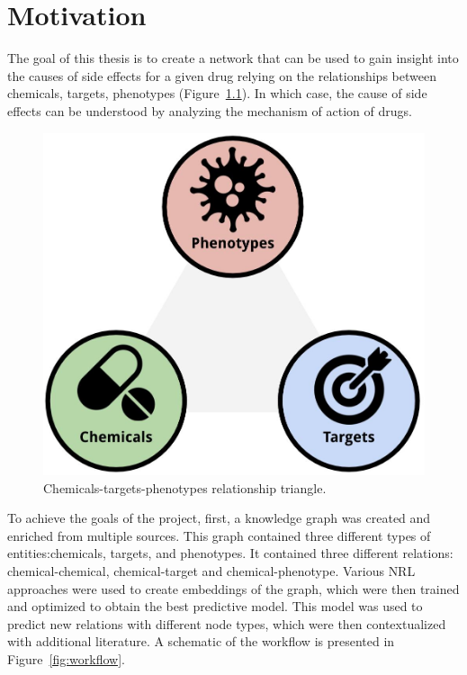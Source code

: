 \chapter{Motivation}\label{motivation}

The goal of this thesis is to create a network that can be used to gain insight into the causes of side effects for a given drug relying on the relationships between chemicals, targets, phenotypes (Figure~\ref{fig:triangle}).
In which case, the cause of side effects can be understood by analyzing the mechanism of action of drugs.

\begin{figure}[!ht]
    \centering
    \includegraphics[scale=0.175]
    {figures/triangle.jpg}
    \caption{\label{fig:triangle} Chemicals-targets-phenotypes relationship triangle.}
\end{figure}

To achieve the goals of the project, first, a knowledge graph was created and enriched from multiple sources.
This graph contained three different types of entities:chemicals, targets, and phenotypes.
It contained three different relations: chemical-chemical, chemical-target and chemical-phenotype.
Various \ac{NRL} approaches were used to create embeddings of the graph, which were then trained and optimized to obtain the best predictive model.
This model was used to predict new relations with different node types, which were then contextualized with additional literature.
A schematic of the workflow is presented in Figure~\ref{fig:workflow}.


